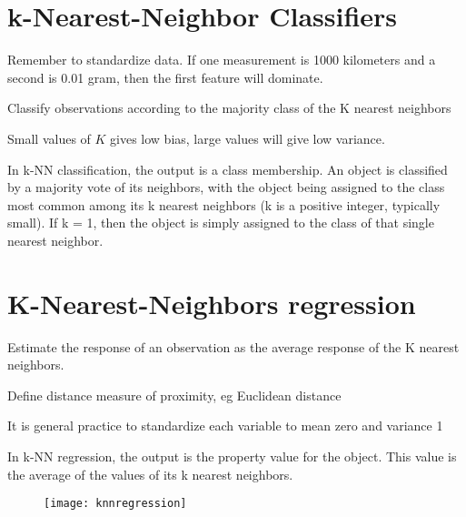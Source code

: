 \section{k-Nearest-Neighbor Classifiers}

Remember to standardize data. If one measurement is 1000 kilometers and a second is 0.01 gram, then the first feature will dominate.

Classify observations according to the majority class of the K nearest neighbors

Small values of $K$  gives low bias, large values will give low variance.

In k-NN classification, the output is a class membership. An object is classified by a majority vote of its neighbors, with the object being assigned to the class most common among its k nearest neighbors (k is a positive integer, typically small). If k = 1, then the object is simply assigned to the class of that single nearest neighbor.

\section{K-Nearest-Neighbors regression}

Estimate the response of an observation as the average response of
the K nearest neighbors.

Define distance measure of proximity, eg Euclidean distance

It is general practice to standardize each variable to mean zero
and variance 1

In k-NN regression, the output is the property value for the object. This value is the average of the values of its k nearest neighbors.

\begin{figure}[H]
  \centering
  \texttt{[image: knnregression]}
\end{figure}


